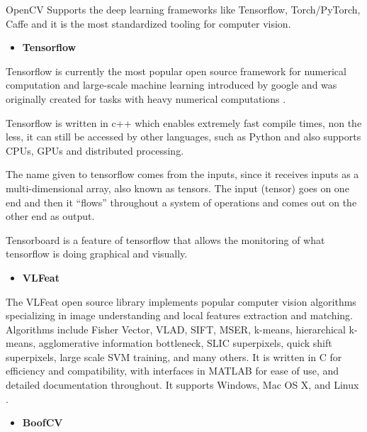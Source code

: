     OpenCV Supports the deep learning frameworks like Tensorflow, Torch/PyTorch, Caffe and it is the most standardized tooling for computer vision.  

   \begin{itemize}
       \item \textbf{Tensorflow}
   \end{itemize} 

    \label{Tensorflow}
   

    Tensorflow is currently the most popular open source framework for numerical computation and large-scale machine learning introduced by google and was originally created for tasks with heavy numerical computations \cite{Abadi} \cite{Dignam1983}.
    
    Tensorflow is written in c++ which enables extremely fast compile times, non the less, it can still be accessed by other languages, such as Python and also supports CPUs, GPUs and distributed processing. \par
    

    The name given to tensorflow comes from the inputs, since it receives inputs as a multi-dimensional array, also known as tensors. The input (tensor) goes on one end and then it “flows” throughout a system of operations and comes out on the other end as output. \par 
    
    Tensorboard is a feature of tensorflow that allows the monitoring of what tensorflow is doing graphical and visually.\par

    \begin{itemize}
        \item \textbf{VLFeat}
    \end{itemize}

    The VLFeat open source library implements popular computer vision algorithms specializing in image understanding and local features extraction and matching. Algorithms include Fisher Vector, VLAD, SIFT, MSER, k-means, hierarchical k-means, agglomerative information bottleneck, SLIC superpixels, quick shift superpixels, large scale SVM training, and many others. It is written in C for efficiency and compatibility, with interfaces in MATLAB for ease of use, and detailed documentation throughout. It supports Windows, Mac OS X, and Linux \cite{vedaldi08vlfeat}.

    \begin{itemize}
        \item \textbf{BoofCV}
    \end{itemize}

